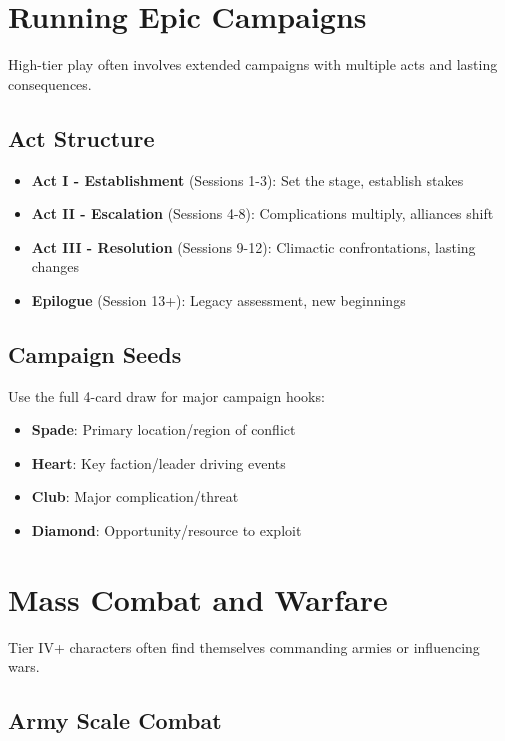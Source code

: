 \section{Running Epic Campaigns}

High-tier play often involves extended campaigns with multiple acts and lasting consequences.

\subsection*{Act Structure}

\begin{itemize}
    \item \textbf{Act I - Establishment} (Sessions 1-3): Set the stage, establish stakes
    \item \textbf{Act II - Escalation} (Sessions 4-8): Complications multiply, alliances shift
    \item \textbf{Act III - Resolution} (Sessions 9-12): Climactic confrontations, lasting changes
    \item \textbf{Epilogue} (Session 13+): Legacy assessment, new beginnings
\end{itemize}

\subsection*{Campaign Seeds}

Use the full 4-card draw for major campaign hooks:
\begin{itemize}
    \item \textbf{Spade}: Primary location/region of conflict
    \item \textbf{Heart}: Key faction/leader driving events
    \item \textbf{Club}: Major complication/threat
    \item \textbf{Diamond}: Opportunity/resource to exploit
\end{itemize}

\section{Mass Combat and Warfare}

Tier IV+ characters often find themselves commanding armies or influencing wars.

\subsection*{Army Scale Combat}

